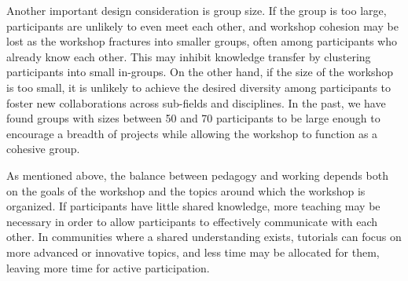 Another important design consideration is group size.
If the group is too large, participants are unlikely to even meet each other, and workshop cohesion may be lost as the workshop fractures into smaller groups, often among participants who already know each other.
This may inhibit knowledge transfer by clustering participants into small in-groups.
On the other hand, if the size of the workshop is too small, it is unlikely to achieve the desired diversity among participants to foster new collaborations across sub-fields and disciplines.
In the past, we have found groups with sizes between 50 and 70 participants to be large enough to encourage a breadth of projects while allowing the workshop to function as a cohesive group.

As mentioned above, the balance between pedagogy and working depends both on the goals of the workshop and the topics around which the workshop is organized.
If participants have little shared knowledge, more teaching may be necessary in order to allow participants to effectively communicate with each other.
In communities where a shared understanding exists, tutorials can focus on more advanced or innovative topics, and less time may be allocated for them, leaving more time for active participation.

